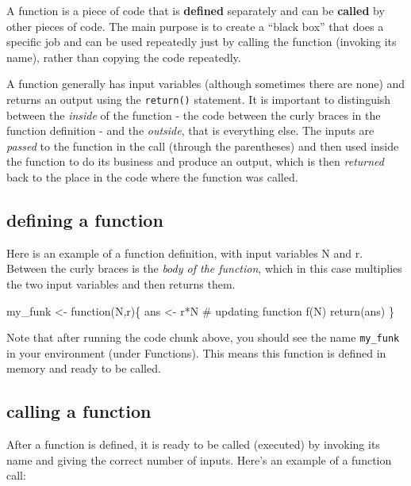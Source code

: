\documentclass[
  letterpaper,
  DIV=11,
  numbers=noendperiod]{scrreprt}
\newenvironment{Shaded}{\begin{snugshade}}{\end{snugshade}}
\newcommand{\CommentTok}[1]{\textcolor[rgb]{0.37,0.37,0.37}{#1}}
\newcommand{\ControlFlowTok}[1]{\textcolor[rgb]{0.00,0.23,0.31}{#1}}
\newcommand{\FunctionTok}[1]{\textcolor[rgb]{0.28,0.35,0.67}{#1}}
\newcommand{\NormalTok}[1]{\textcolor[rgb]{0.00,0.23,0.31}{#1}}
\newcommand{\OtherTok}[1]{\textcolor[rgb]{0.00,0.23,0.31}{#1}}
\newcommand{\SpecialCharTok}[1]{\textcolor[rgb]{0.37,0.37,0.37}{#1}}
\begin{document}
A function is a piece of code that is \textbf{defined} separately and
can be \textbf{called} by other pieces of code. The main purpose is to
create a ``black box'' that does a specific job and can be used
repeatedly just by calling the function (invoking its name), rather than
copying the code repeatedly.

A function generally has input variables (although sometimes there are
none) and returns an output using the \texttt{return()} statement. It is
important to distinguish between the \emph{inside} of the function - the
code between the curly braces in the function definition - and the
\emph{outside}, that is everything else. The inputs are \emph{passed} to
the function in the call (through the parentheses) and then used inside
the function to do its business and produce an output, which is then
\emph{returned} back to the place in the code where the function was
called.

\hypertarget{defining-a-function}{%
\subsection{defining a function}\label{defining-a-function}}

Here is an example of a function definition, with input variables N and
r. Between the curly braces is the \emph{body of the function}, which in
this case multiplies the two input variables and then returns them.

\begin{Shaded}
\begin{Highlighting}[]
\NormalTok{my\_funk }\OtherTok{\textless{}{-}} \ControlFlowTok{function}\NormalTok{(N,r)\{ }
\NormalTok{  ans }\OtherTok{\textless{}{-}}\NormalTok{ r}\SpecialCharTok{*}\NormalTok{N }\CommentTok{\# updating function f(N)}
  \FunctionTok{return}\NormalTok{(ans)}
\NormalTok{\}}
\end{Highlighting}
\end{Shaded}

Note that after running the code chunk above, you should see the name
\texttt{my\_funk} in your environment (under Functions). This means this
function is defined in memory and ready to be called.

\hypertarget{calling-a-function}{%
\subsection{calling a function}\label{calling-a-function}}

After a function is defined, it is ready to be called (executed) by
invoking its name and giving the correct number of inputs. Here's an
example of a function call:
\end{document}
